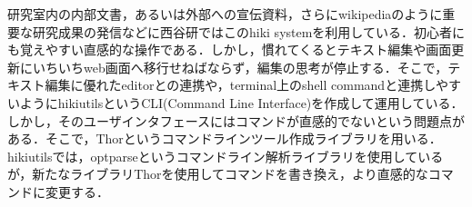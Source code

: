研究室内の内部文書，あるいは外部への宣伝資料，さらにwikipediaのように重要な研究成果の発信などに西谷研ではこのhiki systemを利用している．初心者にも覚えやすい直感的な操作である．しかし，慣れてくるとテキスト編集や画面更新にいちいちweb画面へ移行せねばならず，編集の思考が停止する．そこで，テキスト編集に優れたeditorとの連携や，terminal上のshell commandと連携しやすいようにhikiutilsというCLI(Command Line Interface)を作成して運用している．しかし，そのユーザインタフェースにはコマンドが直感的でないという問題点がある．そこで，Thorというコマンドラインツール作成ライブラリを用いる．hikiutilsでは，optparseというコマンドライン解析ライブラリを使用しているが，新たなライブラリThorを使用してコマンドを書き換え，より直感的なコマンドに変更する．

